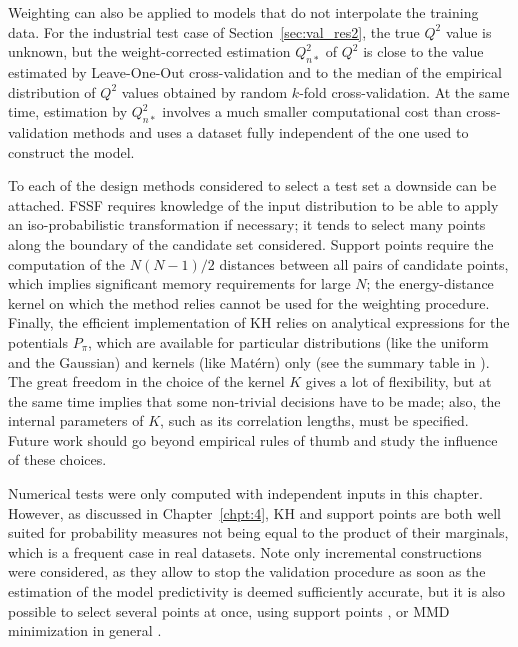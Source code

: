 Weighting can also be applied to models that do not interpolate the training data. 
For the industrial test case of Section~\ref{sec:val_res2}, the true $Q^2$ value is unknown, but the weight-corrected estimation $Q_{n*}^2$ of $Q^2$ is close to the value estimated by Leave-One-Out cross-validation and to the median of the empirical distribution of $Q^2$ values obtained by random $k$-fold cross-validation. 
At the same time, estimation by $Q_{n*}^2$ involves a much smaller computational cost than cross-validation methods and uses a dataset fully independent of the one used to construct the model. 

To each of the design methods considered to select a test set a downside can be attached. 
FSSF requires knowledge of the input distribution to be able to apply an iso-probabilistic transformation if necessary; it tends to select many points along the boundary of the candidate set considered. 
Support points require the computation of the $N(N-1)/2$ distances between all pairs of candidate points, which implies significant memory requirements for large $N$; the energy-distance kernel on which the method relies cannot be used for the weighting procedure. 
Finally, the efficient implementation of KH relies on analytical expressions for the potentials $P_{\pi}$, which are available for particular distributions (like the uniform and the Gaussian) and kernels (like Mat\'{e}rn) only (see the summary table in \citealp[p.66]{briol_phd_2019}). 
The great freedom in the choice of the kernel $K$ gives a lot of flexibility, but at the same time implies that some non-trivial decisions have to be made; also, the internal parameters of $K$, such as its correlation lengths, must be specified. 
Future work should go beyond empirical rules of thumb and study the influence of these choices.

Numerical tests were only computed with independent inputs in this chapter. 
However, as discussed in Chapter~\ref{chpt:4}, KH and support points are both well suited for probability measures not being equal to the product of their marginals, which is a frequent case in real datasets. 
Note only incremental constructions were considered, as they allow to stop the validation procedure as soon as the estimation of the model predictivity is deemed sufficiently accurate, but it is also possible to select several points at once, using support points \citep{mak_joseph_2018}, or MMD minimization in general \citep{teymur_gorham_2021}. 

